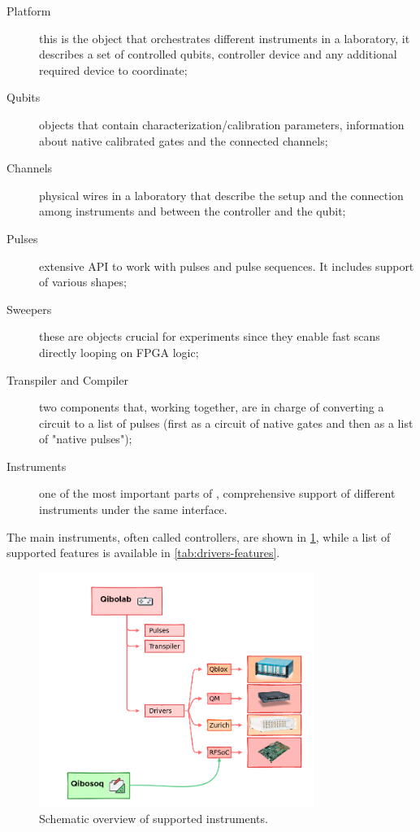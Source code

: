 \begin{description}
    \item[Platform] this is the object that orchestrates different instruments in a laboratory, it describes a set of controlled qubits, controller device and any additional required device to coordinate;
    \item[Qubits] objects that contain characterization/calibration parameters, information about native calibrated gates and the connected channels;
    \item[Channels] physical wires in a laboratory that describe the setup and the connection among instruments and between the controller and the qubit;
    \item[Pulses] extensive API to work with pulses and pulse sequences. It includes support of various shapes;
    \item[Sweepers] these are objects crucial for experiments since they enable fast scans directly looping on FPGA logic;
    \item[Transpiler and Compiler] two components that, working together, are in charge of converting a circuit to a list of pulses (first as a circuit of native gates and then as a list of "native pulses");
    \item[Instruments] one  of the most important parts of \Qibolab, comprehensive support of different instruments under the same interface.
\end{description}

The main instruments, often called controllers, are shown in \cref{fig:qibolab_instruments}, while a list of supported features is available in \cref{tab:drivers-features}.

\begin{figure}[ht]
    \centering
    \includegraphics[width=0.8\textwidth]{Setup-software/figures/qibolab_instruments.png}
    \caption{Schematic overview of \Qibolab supported instruments.}
    \label{fig:qibolab_instruments}
\end{figure}

